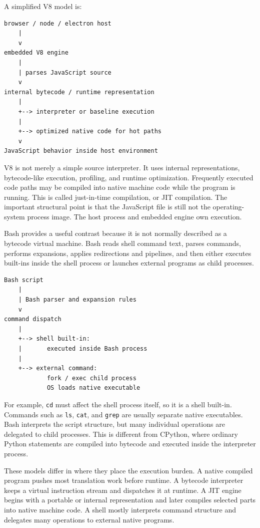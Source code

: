 A simplified V8 model is:

\begin{verbatim}
browser / node / electron host
    |
    v
embedded V8 engine
    |
    | parses JavaScript source
    v
internal bytecode / runtime representation
    |
    +--> interpreter or baseline execution
    |
    +--> optimized native code for hot paths
    v
JavaScript behavior inside host environment
\end{verbatim}

V8 is not merely a simple source interpreter. It uses internal representations, bytecode-like execution, profiling, and runtime optimization. Frequently executed code paths may be compiled into native machine code while the program is running. This is called just-in-time compilation, or JIT compilation. The important structural point is that the JavaScript file is still not the operating-system process image. The host process and embedded engine own execution.

Bash provides a useful contrast because it is not normally described as a bytecode virtual machine. Bash reads shell command text, parses commands, performs expansions, applies redirections and pipelines, and then either executes built-ins inside the shell process or launches external programs as child processes.

\begin{verbatim}
Bash script
    |
    | Bash parser and expansion rules
    v
command dispatch
    |
    +--> shell built-in:
    |       executed inside Bash process
    |
    +--> external command:
            fork / exec child process
            OS loads native executable
\end{verbatim}

For example, \texttt{cd} must affect the shell process itself, so it is a shell built-in. Commands such as \texttt{ls}, \texttt{cat}, and \texttt{grep} are usually separate native executables. Bash interprets the script structure, but many individual operations are delegated to child processes. This is different from CPython, where ordinary Python statements are compiled into bytecode and executed inside the interpreter process.

These models differ in where they place the execution burden. A native compiled program pushes most translation work before runtime. A bytecode interpreter keeps a virtual instruction stream and dispatches it at runtime. A JIT engine begins with a portable or internal representation and later compiles selected parts into native machine code. A shell mostly interprets command structure and delegates many operations to external native programs.

